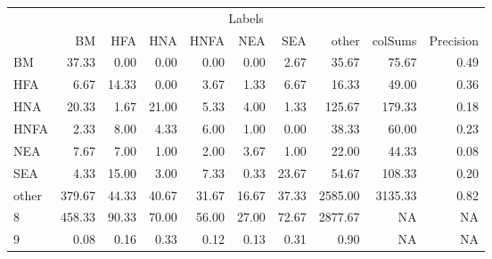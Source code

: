 \begin{table}
\centering\begingroup\fontsize{11}{13}\selectfont

\begin{tabular}{lrrrrrr>{}r|rr}
\toprule
\multicolumn{10}{c}{Labels} \\
\cmidrule(l{3pt}r{3pt}){1-10}
  & BM & HFA & HNA & HNFA & NEA & SEA & other & colSums & Precision\\
\midrule
BM & 37.33 & 0.00 & 0.00 & 0.00 & 0.00 & 2.67 & 35.67 & 75.67 & 0.49\\
HFA & 6.67 & 14.33 & 0.00 & 3.67 & 1.33 & 6.67 & 16.33 & 49.00 & 0.36\\
HNA & 20.33 & 1.67 & 21.00 & 5.33 & 4.00 & 1.33 & 125.67 & 179.33 & 0.18\\
HNFA & 2.33 & 8.00 & 4.33 & 6.00 & 1.00 & 0.00 & 38.33 & 60.00 & 0.23\\
NEA & 7.67 & 7.00 & 1.00 & 2.00 & 3.67 & 1.00 & 22.00 & 44.33 & 0.08\\
\addlinespace
SEA & 4.33 & 15.00 & 3.00 & 7.33 & 0.33 & 23.67 & 54.67 & 108.33 & 0.20\\
other & 379.67 & 44.33 & 40.67 & 31.67 & 16.67 & 37.33 & 2585.00 & 3135.33 & 0.82\\
8 & 458.33 & 90.33 & 70.00 & 56.00 & 27.00 & 72.67 & 2877.67 & NA & NA\\
9 & 0.08 & 0.16 & 0.33 & 0.12 & 0.13 & 0.31 & 0.90 & NA & NA\\
\bottomrule
\end{tabular}
\endgroup{}
\end{table}
